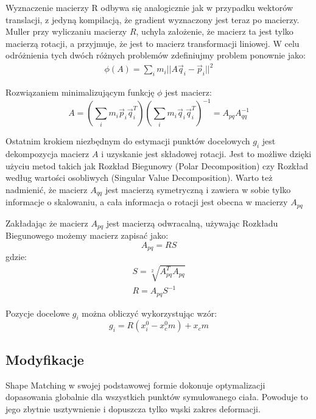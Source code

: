 Wyznaczenie macierzy R odbywa się analogicznie jak w przypadku wektorów
translacji, z jedyną kompilacją, że gradient wyznaczony jest teraz po macierzy.
Muller \cite{shape} przy wyliczaniu macierzy $R$, uchyla założenie, że macierz ta
jest tylko macierzą rotacji, a przyjmuje, że jest to macierz transformacji
liniowej. W celu odróżnienia tych dwóch różnych problemów zdefiniujmy problem
ponownie jako:
\begin{eqnarray}
\phi(A) = \sum_i m_i || A \vec{q}_i - \vec{p}_i||^2
\end{eqnarray}

Rozwiązaniem minimalizującym funkcję $\phi$ jest macierz:\cite{shape}
\begin{equation}
A = (\sum_i m_i \vec{p}_i \vec{q}^T_i)(\sum_i m_i \vec{q}_i \vec{q}^T_i)^{-1}
= A_{pq} A_{qq}^{-1}
\end{equation}

Ostatnim krokiem niezbędnym do estymacji punktów docelowych $g_i$ jest
dekompozycja macierz $A$ i uzyskanie jest składowej rotacji. Jest to możliwe dzięki
użyciu metod takich jak Rozkład Biegunowy (Polar Decomposition) czy Rozkład
według wartości osobliwych (Singular Value Decomposition). Warto też nadmienić,
	że macierz $A_{qq}$ jest macierzą symetryczną i zawiera w sobie tylko
	informacje o skalowaniu, a cała informacja o rotacji jest obecna w
	macierzy $A_{pq}$

Zakładając że macierz $A_{pq}$ jest macierzą odwracalną, używając Rozkładu
Biegunowego możemy macierz zapisać jako:
\begin{equation}
A_{pq} = RS
\end{equation}
gdzie:
\begin{eqnarray*}
S = \sqrt[2]{A^T_{pq} A_{pq}}\\
R = A_{pq} S^{-1}
\end{eqnarray*}

Pozycje docelowe $g_i$ można obliczyć wykorzystując wzór:
\begin{equation}
g_i = R(x_i^0 - x^0_cm) + x_cm
\end{equation}

\subsection{Modyfikacje}
Shape Matching w swojej podstawowej formie dokonuje optymalizacji dopasowania
globalnie dla wszystkich punktów symulowanego ciała. Powoduje to jego zbytnie
usztywnienie i dopuszcza tylko wąski zakres deformacji.

